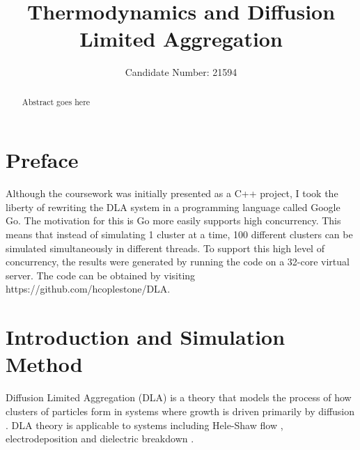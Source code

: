 \documentclass[11pt]{iopart}
\begin{document}
\setlength{\marginparwidth}{1.5cm}

\title[]{Thermodynamics and Diffusion Limited Aggregation}

\author{Candidate Number: 21594}

\address{Department of Physics,
University of Bath, Bath BA2 7AY, United Kingdom}
\begin{abstract}
Abstract goes here
\end{abstract}



\section*{Preface}
Although the coursework was initially presented as a C++ project, I took the liberty of rewriting the DLA system in a programming language called Google Go. The motivation for this is Go more easily supports high concurrency. This means that instead of simulating 1 cluster at a time, 100 different clusters can be simulated simultaneously in different threads. To support this high level of concurrency, the results were generated by running the code on a 32-core virtual server. The code can be obtained by visiting https://github.com/hcoplestone/DLA.

\section{Introduction and Simulation Method}

Diffusion Limited Aggregation (DLA) is a theory that models the process of how clusters of particles form in systems where growth is driven primarily by diffusion \cite{dla}. DLA theory is applicable to systems including Hele-Shaw flow \cite{heleshaw}, electrodeposition \cite{electrodeposition} and dielectric breakdown \cite{electricbreakdown}.
\end{document}
